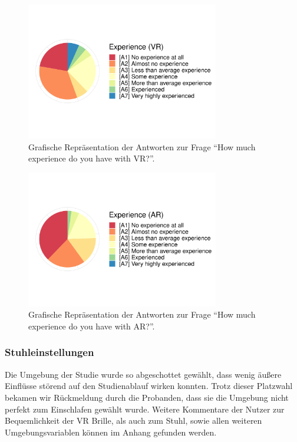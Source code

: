 \begin{figure}[H]
	\centering
	\includegraphics[width=0.75\textwidth]{./_StudyResults/expVr}
	\caption{Grafische Repräsentation der Antworten zur Frage "`How much experience do you have with VR?"'.}
	\label{fig:expVr}
\end{figure}%
\begin{figure}[H]
	\centering
	\includegraphics[width=0.75\textwidth]{./_StudyResults/expAr}
	\caption{Grafische Repräsentation der Antworten zur Frage "`How much experience do you have with AR?"'.}
	\label{fig:expAr}
\end{figure}


\subsubsection{Stuhleinstellungen}

Die Umgebung der Studie wurde so abgeschottet gewählt, dass wenig äußere Einflüsse störend auf den Studienablauf wirken konnten. Trotz dieser Platzwahl bekamen wir Rückmeldung durch die Probanden, dass sie die Umgebung nicht perfekt zum Einschlafen gewählt wurde. Weitere Kommentare der Nutzer zur Bequemlichkeit der VR Brille, als auch zum Stuhl, sowie allen weiteren Umgebungsvariablen können im Anhang gefunden werden.

